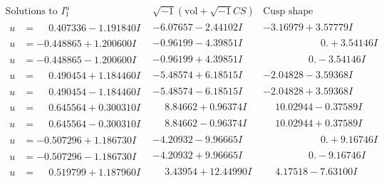 \documentclass[1p]{elsarticle_modified}
\theoremstyle{definition}
\newcommand{\I}{\sqrt{-1}}
\begin{document}
$$\begin{array}{c|c|c}
\text{Solutions to }I^u_{1}& \I (\text{vol} + \sqrt{-1}CS) & \text{Cusp shape}\\
 \hline 
\begin{aligned}
u &= \phantom{-}0.407336 - 1.191840 I\end{aligned}
 & -6.07657 - 2.44102 I & -3.16979 + 3.57779 I \\ \hline\begin{aligned}
u &= -0.448865 + 1.200600 I\end{aligned}
 & -0.96199 - 4.39851 I & \phantom{-0.000000 -}0. + 3.54146 I \\ \hline\begin{aligned}
u &= -0.448865 - 1.200600 I\end{aligned}
 & -0.96199 + 4.39851 I & \phantom{-0.000000 } 0. - 3.54146 I \\ \hline\begin{aligned}
u &= \phantom{-}0.490454 + 1.184460 I\end{aligned}
 & -5.48574 + 6.18515 I & -2.04828 - 3.59368 I \\ \hline\begin{aligned}
u &= \phantom{-}0.490454 - 1.184460 I\end{aligned}
 & -5.48574 - 6.18515 I & -2.04828 + 3.59368 I \\ \hline\begin{aligned}
u &= \phantom{-}0.645564 + 0.300310 I\end{aligned}
 & \phantom{-}8.84662 + 0.96374 I & \phantom{-}10.02944 - 0.37589 I \\ \hline\begin{aligned}
u &= \phantom{-}0.645564 - 0.300310 I\end{aligned}
 & \phantom{-}8.84662 - 0.96374 I & \phantom{-}10.02944 + 0.37589 I \\ \hline\begin{aligned}
u &= -0.507296 + 1.186730 I\end{aligned}
 & -4.20932 - 9.96665 I & \phantom{-0.000000 -}0. + 9.16746 I \\ \hline\begin{aligned}
u &= -0.507296 - 1.186730 I\end{aligned}
 & -4.20932 + 9.96665 I & \phantom{-0.000000 } 0. - 9.16746 I \\ \hline\begin{aligned}
u &= \phantom{-}0.519799 + 1.187960 I\end{aligned}
 & \phantom{-}3.43954 + 12.44990 I & \phantom{-}4.17518 - 7.63100 I \\ \hline\begin{aligned}

\end{aligned}
\end{array}$$
\end{document}
